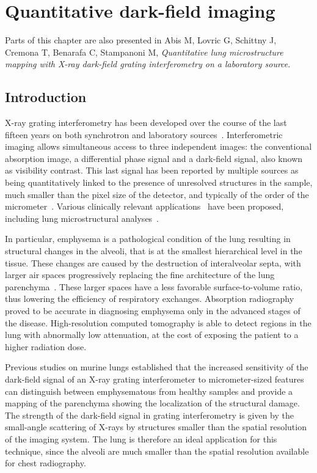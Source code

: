 \chapter{Quantitative dark-field imaging}\label{ch:lung-dark-field}
Parts of this chapter are also presented in Abis M, Lovric G, Schittny J, Cremona T, Benarafa C, Stampanoni
M, \emph{Quantitative lung microstructure mapping with X-ray dark-field grating interferometry on a laboratory source}.
\section{Introduction}\label{sec:introduction}
X-ray grating interferometry has been developed over the course of the last
fifteen years on both synchrotron and laboratory
sources~\parencite{David_2002,1347-4065-42-7B-L866,Weitkamp_2005,1347-4065-45-6R-5254,Pfeiffer2006}.
Interferometric imaging allows simultaneous access to three independent
images: the conventional absorption image, a differential phase signal and a
dark-field signal, also known as visibility contrast. This last signal has
been reported by multiple sources as being quantitatively linked to the
presence of unresolved structures in the sample, much smaller than the pixel
size of the detector, and typically of the order of the
micrometer~\parencite{Pfeiffer2008,Lynch:11,Yashiro:10}. Various clinically
relevant applications~\parencite{Wen_2009,Thilo2013} have been
proposed, including lung microstructural analyses~\parencite{Schleede17880,Meinel_2014,Meinel_2013,Yaroshenko_2013}.

In particular, emphysema is a pathological condition of the lung
resulting in structural changes in the alveoli, that is at the smallest
hierarchical level in the tissue. These changes are caused by the
destruction of interalveolar septa, with larger air spaces progressively
replacing the fine architecture of the lung
parenchyma~\parencite{Sharafkhaneh_2008}. These larger spaces have a less
favorable surface-to-volume ratio, thus lowering the efficiency
of respiratory exchanges. Absorption radiography proved to be accurate in
diagnosing emphysema only in the advanced stages of the disease. 
High-resolution computed tomography is able to detect regions in the lung
with abnormally low attenuation, at the cost of exposing the patient
to a higher radiation dose.

Previous studies on murine lungs established that the increased sensitivity of
the dark-field signal of an X-ray grating interferometer to micrometer-sized
features can distinguish between emphysematous from healthy samples and
provide a mapping of the parenchyma showing the localization of the
structural damage.
The strength of the dark-field signal in grating interferometry is
given by the small-angle scattering of X-rays by structures smaller than the
spatial resolution of the imaging system. The lung is therefore an ideal
application for this technique, since the alveoli are much
smaller than the spatial resolution available for chest radiography.

